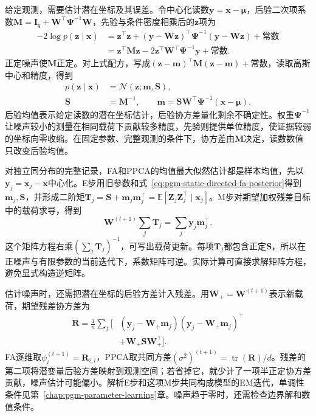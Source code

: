 给定观测，需要估计潜在坐标及其误差。令中心化读数$\bm y=\bm x-\bm\mu$，后验二次项系数$\bm M=\bm I_q+\bm W^\top\bm\Psi^{-1}\bm W$，先验与条件密度相乘后的$\bm z$项为
\[
  \begin{aligned}
    -2\log p(\bm{z}\mid\bm{x})
      &=\bm{z}^{\top}\bm{z}
       +(\bm{y}-\bm{W}\bm{z})^{\top}
          \bm{\Psi}^{-1}(\bm{y}-\bm{W}\bm{z})
       +\text{常数}\\
      &=\bm{z}^{\top}\bm{M}\bm{z}
       -2\bm{z}^{\top}\bm{W}^{\top}\bm{\Psi}^{-1}\bm{y}
       +\text{常数}.
  \end{aligned}
\]
正定噪声使$\bm M$正定。对上式配方，写成$(\bm z-\bm m)^\top\bm M(\bm z-\bm m)+\text{常数}$，读取高斯中心和精度，得到
\begin{equation}
  \label{eq:pgm-static-directed-fa-posterior}
  \begin{aligned}
    p(\bm{z}\mid\bm{x})&=\mathcal{N}(\bm{z};\bm{m},\bm{S}),\\
    \bm{S}&=\bm{M}^{-1},\qquad
    \bm{m}=\bm{S}\bm{W}^{\top}\bm{\Psi}^{-1}
                  (\bm{x}-\bm{\mu}).
  \end{aligned}
\end{equation}
后验均值表示给定读数的潜在坐标估计，后验协方差量化剩余不确定性。权重$\bm\Psi^{-1}$让噪声较小的测量在相同载荷下贡献较多精度，先验则提供单位精度，使证据较弱的坐标向零收缩。在固定参数、完整观测的条件下，协方差由$\bm M$决定，读数数值只改变后验均值。

对独立同分布的完整记录，FA和PPCA的均值最大似然估计都是样本均值，先以$\bm y_j=\bm x_j-\overline{\bm x}$中心化。E步用旧参数和式~\eqref{eq:pgm-static-directed-fa-posterior}得到$\bm m_j,\bm S$，并形成二阶矩$\bm T_j=\bm S+\bm m_j\bm m_j^\top=\mathbb E[\bm Z_j\bm Z_j^\top\mid\bm x_j]$。M步对期望加权残差目标中的载荷求导，得到
\[
  \bm{W}^{(t+1)}\sum_j\bm{T}_j
     =\sum_j\bm{y}_j\bm{m}_j^\top.
\]
这个矩阵方程右乘$\left(\sum_j\bm T_j\right)^{-1}$，可写出载荷更新。每项$\bm T_j$都包含正定$\bm S$，所以在正噪声与有限参数的当前迭代下，系数矩阵可逆。实际计算可直接求解矩阵方程，避免显式构造逆矩阵。

估计噪声时，还需把潜在坐标的后验方差计入残差。用$\bm W_+=\bm W^{(t+1)}$表示新载荷，期望残差协方差为
\begin{equation}
  \label{eq:pgm-static-directed-fa-residual}
  \begin{aligned}
    \bm{R}=\frac1n\sum_j\bigl[
      &(\bm{y}_j-\bm{W}_{+}\bm{m}_j)
       (\bm{y}_j-\bm{W}_{+}\bm{m}_j)^\top\\
      &+\bm{W}_{+}\bm{S}\bm{W}_{+}^\top
    \bigr].
  \end{aligned}
\end{equation}
FA逐维取$\psi_i^{(t+1)}=\bm R_{i,i}$，PPCA取共同方差$(\sigma^2)^{(t+1)}=\operatorname{tr}(\bm R)/d$。残差的第二项将潜变量后验方差映射到观测空间；若省掉它，就少计了一项半正定协方差贡献，噪声估计可能偏小。解析E步和这项M步共同构成模型的EM迭代，单调性条件见第~\ref{chap:pgm-parameter-learning}章。噪声趋于零时，还需检查边界解和数值条件。

